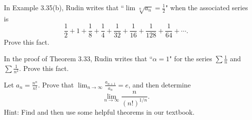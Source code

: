 \documentclass[12pt,letterpaper,boxed,cm]{hmcpset}
\begin{document}

\begin{problem}[1)]
    In Example 3.35(b), Rudin writes that ``$\lim \sqrt[n]{a_n} = \frac{1}{2} $" when the associated series is 
    \[
        \frac{1}{2} + 1 + \frac{1}{8} + \frac{1}{4} + \frac{1}{32} + \frac{1}{16} + \frac{1}{128} + \frac{1}{64} + \cdots.       
    \]
    Prove this fact. 
\end{problem}

\begin{solution}
    \vfill
\end{solution}
\newpage

\begin{problem}[2)]
    In the proof of Theorem 3.33, Rudin writes that ``$\alpha = 1$" for the series $\sum \frac{1}{n}$ and $\sum \frac{1}{n^2}$.  Prove this fact.  
\end{problem}

\begin{solution}
    \vfill
\end{solution}
\newpage

\begin{problem}[3)]
    Let $\displaystyle{a_n = \frac{n^n}{n!}}$.  Prove that $\displaystyle{\lim_{n \to \infty}  \frac{a_{n+1}}{a_n}} = e$, and then determine  
    \[
        \lim_{n \to \infty} \frac{n}{(n!)^{1/n}}.  
    \]
    Hint:  Find and then use some helpful theorems in our textbook.  
\end{problem}

\begin{solution}
    \vfill
\end{solution}
\newpage
\end{document}
